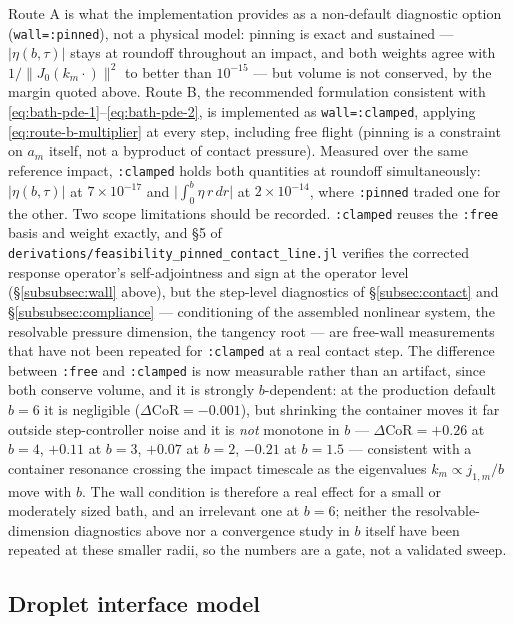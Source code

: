 Route A is what the implementation provides as a non-default diagnostic option (\texttt{wall=:pinned}), not a physical model: pinning is exact and sustained --- $|\eta(b,\tau)|$ stays at roundoff throughout an impact, and both weights agree with $1/\lVert J_0(k_m\cdot)\rVert^2$ to better than $10^{-15}$ --- but volume is not conserved, by the margin quoted above. Route B, the recommended formulation consistent with \eqref{eq:bath-pde-1}--\eqref{eq:bath-pde-2}, is implemented as \texttt{wall=:clamped}, applying \eqref{eq:route-b-multiplier} at every step, including free flight (pinning is a constraint on $a_m$ itself, not a byproduct of contact pressure). Measured over the same reference impact, \texttt{:clamped} holds both quantities at roundoff simultaneously: $|\eta(b,\tau)|$ at $7\times10^{-17}$ and $\big|\int_0^b\eta\,r\,dr\big|$ at $2\times10^{-14}$, where \texttt{:pinned} traded one for the other. Two scope limitations should be recorded. \texttt{:clamped} reuses the \texttt{:free} basis and weight exactly, and \S5 of \texttt{derivations/feasibility\_pinned\_contact\_line.jl} verifies the corrected response operator's self-adjointness and sign at the operator level (\S\ref{subsubsec:wall} above), but the step-level diagnostics of \S\ref{subsec:contact} and \S\ref{subsubsec:compliance} --- conditioning of the assembled nonlinear system, the resolvable pressure dimension, the tangency root --- are free-wall measurements that have not been repeated for \texttt{:clamped} at a real contact step. The difference between \texttt{:free} and \texttt{:clamped} is now measurable rather than an artifact, since both conserve volume, and it is strongly $b$-dependent: at the production default $b=6$ it is negligible ($\Delta\mathrm{CoR}=-0.001$), but shrinking the container moves it far outside step-controller noise and it is \emph{not} monotone in $b$ --- $\Delta\mathrm{CoR}=+0.26$ at $b=4$, $+0.11$ at $b=3$, $+0.07$ at $b=2$, $-0.21$ at $b=1.5$ --- consistent with a container resonance crossing the impact timescale as the eigenvalues $k_m\propto j_{1,m}/b$ move with $b$. The wall condition is therefore a real effect for a small or moderately sized bath, and an irrelevant one at $b=6$; neither the resolvable-dimension diagnostics above nor a convergence study in $b$ itself have been repeated at these smaller radii, so the numbers are a gate, not a validated sweep.

\subsection{Droplet interface model}
\label{subsec:drop}

